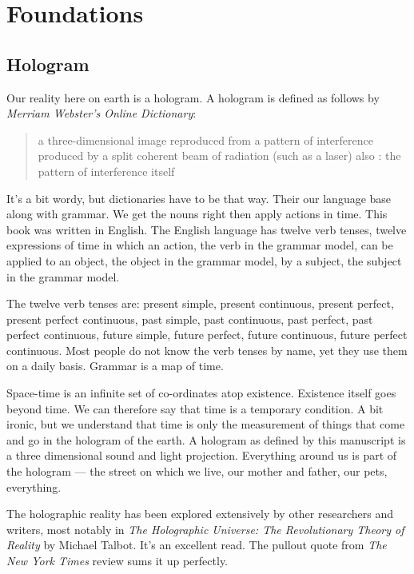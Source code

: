 \documentclass[letterpaper,11pt,twoside,titlepage,onecolumn,openany]{book}
\begin{document}
\chapter{Foundations}




\section*{Hologram}\label{hologram}

Our reality here on earth is a hologram. A hologram is defined as
follows by \emph{Merriam Webster's Online Dictionary}:

\begin{quote}
a three-dimensional image reproduced from a pattern of interference
produced by a split coherent beam of radiation (such as a laser) also :
the pattern of interference itself
\end{quote}

It's a bit wordy, but dictionaries have to be that way. Their our
language base along with grammar. We get the nouns right then apply
actions in time. This book was written in English. The English language
has twelve verb tenses, twelve expressions of time in which an action,
the verb in the grammar model, can be applied to an object, the object
in the grammar model, by a subject, the subject in the grammar model.

The twelve verb tenses are: present simple, present continuous, present
perfect, present perfect continuous, past simple, past continuous, past
perfect, past perfect continuous, future simple, future perfect, future
continuous, future perfect continuous. Most people do not know the verb
tenses by name, yet they use them on a daily basis. Grammar is a map of
time.

Space-time is an infinite set of co-ordinates atop existence. Existence
itself goes beyond time. We can therefore say that time is a temporary
condition. A bit ironic, but we understand that time is only the
measurement of things that come and go in the hologram of the earth. A
hologram as defined by this manuscript is a three dimensional sound and
light projection. Everything around us is part of the hologram --- the
street on which we live, our mother and father, our pets, everything.

The holographic reality has been explored extensively by other
researchers and writers, most notably in \emph{The Holographic Universe:
The Revolutionary Theory of Reality} by Michael Talbot. It's an
excellent read. The pullout quote from \emph{The New York Times} review
sums it up perfectly.
\end{document}
